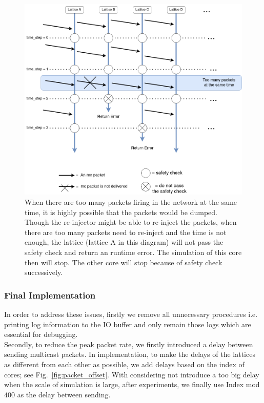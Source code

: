 \begin{figure}[tb]
   \centering
       \includegraphics[width=1\textwidth]{figures/packet_error.png}
       \caption{When there are too many packets firing in the network at the same time, it is highly possible that the packets would be dumped. Though the re-injector might be able to re-inject the packets, when there are too many packets need to re-inject and the time is not enough, the lattice (lattice A in this diagram) will not pass the safety check and return an runtime error. The simulation of this core then will stop. The other core will stop because of safety check successively.}
       \label{fig:packet_error}
\end{figure}
\subsubsection{Final Implementation}
In order to address these issues, firstly we remove all unnecessary procedures i.e. printing log information to the IO buffer and only remain those logs which are essential for debugging.\\

Secondly, to reduce the peak packet rate, we firstly introduced a delay between sending multicast packets. In implementation, to make the delays of the lattices as different from each other as possible, we add delays based on the index of cores; see Fig.~\ref{fig:packet_offset}. With considering not introduce a too big delay when the scale of simulation is large, after experiments, we finally use Index mod $400$ as the delay between sending.\\

